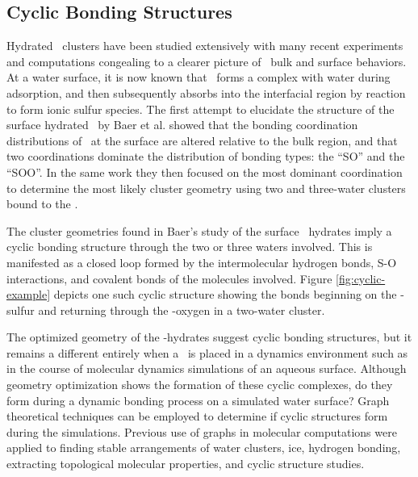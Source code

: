 \subsection {Cyclic Bonding Structures}

Hydrated \suldiox~clusters have been studied extensively with many recent experiments and computations congealing to a clearer picture of \suldiox~bulk and surface behaviors.\cite{Baer2010, Tarbuck2005, Tarbuck2006, Ota2011, Bishenden1998, Hirabayashi2006, Steudel2009, Yang2002, Hayashi1985, Moin2011, Eckl2008} At a water surface, it is now known that \suldiox~forms a complex with water during adsorption, and then subsequently absorbs into the interfacial region by reaction to form ionic sulfur species.\cite{Tarbuck2005, Tarbuck2006, Ota2011} The first attempt to elucidate the structure of the surface hydrated \suldiox~by Baer et al. showed that the bonding coordination distributions of \suldiox~at the surface are altered relative to the bulk region, and that two coordinations dominate the distribution of bonding types: the ``SO'' and the ``SOO''. In the same work they then focused on the most dominant coordination to determine the most likely cluster geometry using two and three-water clusters bound to the \suldiox.

The cluster geometries found in Baer's study of the surface \suldiox~hydrates imply a cyclic bonding structure through the two or three waters involved. This is manifested as a closed loop formed by the intermolecular hydrogen bonds, S-O interactions, and covalent bonds of the molecules involved. Figure \ref{fig:cyclic-example} depicts one such cyclic structure showing the bonds beginning on the \suldiox-sulfur and returning through the \suldiox-oxygen in a two-water cluster.

The optimized geometry of the \suldiox-hydrates suggest cyclic bonding structures, but it remains a different entirely when a \suldiox~is placed in a dynamics environment such as in the course of molecular dynamics simulations of an aqueous surface. Although geometry optimization shows the formation of these cyclic complexes, do they form during a dynamic bonding process on a simulated water surface? Graph theoretical techniques can be employed to determine if cyclic structures form during the simulations. Previous use of graphs in molecular computations were applied to finding stable arrangements of water clusters, ice, hydrogen bonding, extracting topological molecular properties, and cyclic structure studies.\cite{Anick2002, Huber2007, Radhakrishnan1991, Shi2005, Garcia2004, McDonald1998}

